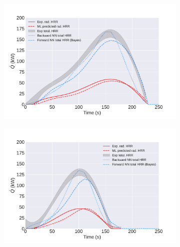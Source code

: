 \documentclass{article}
\begin{document}
\begin{figure}[htbp]
  \centering
  \begin{subfigure}[t]{.45\textwidth}
      \centering
      \includegraphics[width=\textwidth,keepaspectratio]{figures/nhex_12in_1_final.pdf}
      \caption{}
      \label{fig:nhex_12in_1}
  \end{subfigure}
  \begin{subfigure}[t]{.45\textwidth}
      \centering
      \includegraphics[width=\textwidth ,keepaspectratio]{figures/nhex_12in_2_final.pdf}
      \caption{}
      \label{fig:nhex_12in_2}
  \end{subfigure}
  \caption{} 
  \label{fig:nhex_fires}
\end{figure}
\end{document}
